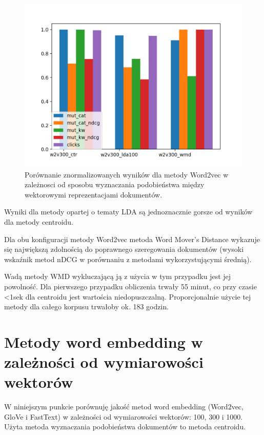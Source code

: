\documentclass[pl]{minipw} %
\begin{document}
\begin{figure}[H]
	\centering
	\includegraphics[width=1\textwidth]{img/results/w2v300_ctr_w2v300_lda100_w2v300_wmd_.png}
	\caption{Porównanie znormalizowanych wyników dla metody Word2vec w zależnosci od sposobu wyznaczania podobieństwa między wektorowymi reprezentacjami dokumentów.}
\end{figure}

Wyniki dla metody opartej o tematy LDA są jednoznacznie gorsze od wyników dla metody centroidu.

Dla obu konfiguracji metody Word2vec metoda Word Mover's Distance wykazuje się największą zdolnością do poprawnego szeregowania dokumentów (wysoki wskaźnik metod nDCG w porównaniu z metodami wykorzystującymi średnią).

Wadą metody WMD wykluczającą ją z użycia w tym przypadku jest jej powolność. Dla pierwszego przypadku  obliczenia trwały 55 minut, co przy czasie <1sek dla centroidu jest wartościa niedopuszczalną. Proporcjonalnie użycie tej metody dla całego korpusu trwałoby ok. 183 godzin.


\section{Metody word embedding w zależności od wymiarowości wektorów}

W niniejszym punkcie porównuję jakość metod word embedding (Word2vec, GloVe i FastText) w zależności od wymiarowości wektorów: 100, 300 i 1000. Użyta metoda wyznaczania podobieństwa dokumentów to metoda centroidu.
\end{document}
